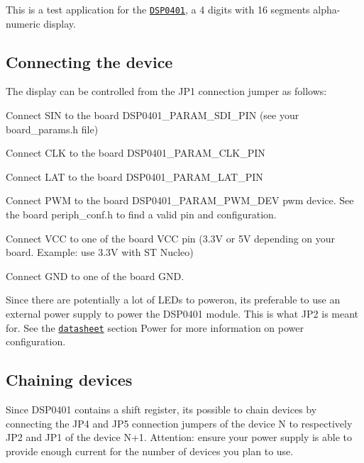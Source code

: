 This is a test application for the \href{https://www.embeddedadventures.com/datasheets/DSP-0401B_hw_v4.pdf}{\tt D\+S\+P0401}, a 4 digits with 16 segments alpha-\/numeric display.

\subsection*{Connecting the device}

The display can be controlled from the J\+P1 connection jumper as follows\+:
\begin{DoxyItemize}
\item Connect {\ttfamily S\+IN} to the board {\ttfamily D\+S\+P0401\+\_\+\+P\+A\+R\+A\+M\+\_\+\+S\+D\+I\+\_\+\+P\+IN} (see your board\+\_\+params.\+h file)
\item Connect {\ttfamily C\+LK} to the board {\ttfamily D\+S\+P0401\+\_\+\+P\+A\+R\+A\+M\+\_\+\+C\+L\+K\+\_\+\+P\+IN}
\item Connect {\ttfamily L\+AT} to the board {\ttfamily D\+S\+P0401\+\_\+\+P\+A\+R\+A\+M\+\_\+\+L\+A\+T\+\_\+\+P\+IN}
\item Connect {\ttfamily P\+WM} to the board {\ttfamily D\+S\+P0401\+\_\+\+P\+A\+R\+A\+M\+\_\+\+P\+W\+M\+\_\+\+D\+EV} pwm device. See the board periph\+\_\+conf.\+h to find a valid pin and configuration.
\item Connect {\ttfamily V\+CC} to one of the board V\+CC pin (3.\+3V or 5V depending on your board. Example\+: use 3.\+3V with ST Nucleo)
\item Connect {\ttfamily G\+ND} to one of the board G\+ND.
\end{DoxyItemize}

Since there are potentially a lot of L\+E\+Ds to poweron, it\textquotesingle{}s preferable to use an external power supply to power the D\+S\+P0401 module. This is what J\+P2 is meant for. See the \href{https://www.embeddedadventures.com/datasheets/DSP-0401B_hw_v4.pdf}{\tt datasheet} section {\ttfamily Power} for more information on power configuration.

\subsection*{Chaining devices}

Since D\+S\+P0401 contains a shift register, it\textquotesingle{}s possible to chain devices by connecting the J\+P4 and J\+P5 connection jumpers of the device N to respectively J\+P2 and J\+P1 of the device N+1. Attention\+: ensure your power supply is able to provide enough current for the number of devices you plan to use. 